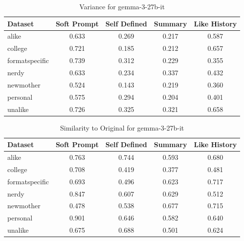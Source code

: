 \documentclass[11pt]{article}
\begin{document}
\begin{table}[H]
    \centering
    \caption{Variance for gemma-3-27b-it}
    \begin{tabular}{|l|c|c|c|c|}
    \hline
    \textbf{Dataset} & \textbf{Soft Prompt} & \textbf{Self Defined} & \textbf{Summary} & \textbf{Like History} \\
    \hline
    alike & 0.633 & 0.269 & 0.217 & 0.587 \\
    \hline
    college & 0.721 & 0.185 & 0.212 & 0.657 \\
    \hline
    formatspecific & 0.739 & 0.312 & 0.229 & 0.355 \\
    \hline
    nerdy & 0.633 & 0.234 & 0.337 & 0.432 \\
    \hline
    newmother & 0.524 & 0.143 & 0.219 & 0.360 \\
    \hline
    personal & 0.575 & 0.294 & 0.204 & 0.401 \\
    \hline
    unalike & 0.726 & 0.325 & 0.321 & 0.658 \\
    \hline
    \end{tabular}
    \end{table}

\begin{table}[H]
    \centering
    \caption{Similarity to Original for gemma-3-27b-it}
    \begin{tabular}{|l|c|c|c|c|}
    \hline
    \textbf{Dataset} & \textbf{Soft Prompt} & \textbf{Self Defined} & \textbf{Summary} & \textbf{Like History} \\
    \hline
    alike & 0.763 & 0.744 & 0.593 & 0.680 \\
    \hline
    college & 0.708 & 0.419 & 0.377 & 0.481 \\
    \hline
    formatspecific & 0.693 & 0.496 & 0.623 & 0.717 \\
    \hline
    nerdy & 0.847 & 0.607 & 0.629 & 0.512 \\
    \hline
    newmother & 0.478 & 0.538 & 0.677 & 0.715 \\
    \hline
    personal & 0.901 & 0.646 & 0.582 & 0.640 \\
    \hline
    unalike & 0.675 & 0.688 & 0.501 & 0.624 \\
    \hline
    \end{tabular}
\end{table}

\clearpage
\end{document}
